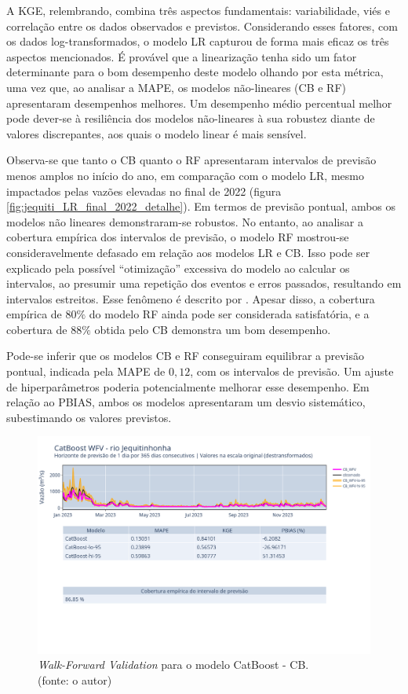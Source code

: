 A KGE, relembrando, combina três aspectos fundamentais: variabilidade, viés e correlação entre os dados observados e previstos. Considerando esses fatores, com os dados log-transformados, o modelo LR capturou de forma mais eficaz os três aspectos mencionados. É provável que a linearização tenha sido um fator determinante para o bom desempenho deste modelo olhando por esta métrica, uma vez que, ao analisar a MAPE, os modelos não-lineares (CB e RF) apresentaram desempenhos melhores. Um desempenho médio percentual melhor pode dever-se à resiliência dos modelos não-lineares à sua robustez diante de valores discrepantes, aos quais o modelo linear é mais sensível.

Observa-se que tanto o CB quanto o RF apresentaram intervalos de previsão menos amplos no início do ano, em comparação com o modelo LR, mesmo impactados pelas vazões elevadas no final de 2022 (figura \ref{fig:jequiti_LR_final_2022_detalhe}). Em termos de previsão pontual, ambos os modelos não lineares demonstraram-se robustos. No entanto, ao analisar a cobertura empírica dos intervalos de previsão, o modelo RF mostrou-se consideravelmente defasado em relação aos modelos LR e CB. Isso pode ser explicado pela possível ``otimização'' excessiva do modelo ao calcular os intervalos, ao presumir uma repetição dos eventos e erros passados, resultando em intervalos estreitos. Esse fenômeno é descrito por \citet{RobHyndman_prediction_intervals}. Apesar disso, a cobertura empírica de $80\%$ do modelo RF ainda pode ser considerada satisfatória, e a cobertura de $88\%$ obtida pelo CB demonstra um bom desempenho.

Pode-se inferir que os modelos CB e RF conseguiram equilibrar a previsão pontual, indicada pela MAPE de $0,12$, com os intervalos de previsão. Um ajuste de hiperparâmetros poderia potencialmente melhorar esse desempenho. Em relação ao PBIAS, ambos os modelos apresentaram um desvio sistemático, subestimando os valores previstos.

\begin{figure}[!h]
	\centering
	\includegraphics[scale=0.33]{Figuras/jequiti/wfv/CB/CB_WFV_LOG.png}
	\caption{\textit{Walk-Forward Validation} para o modelo CatBoost - CB.\\(fonte: o autor)}
	\label{fig:jequiti_CB_WFV_LOG}
\end{figure}

